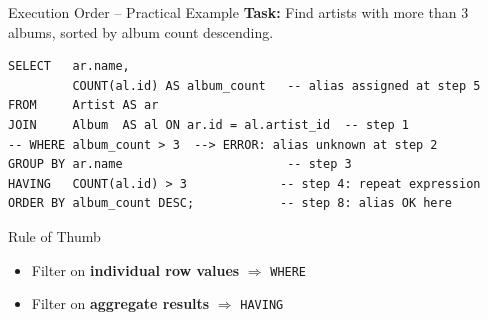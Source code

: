 \begin{frame}[fragile]{Execution Order -- Practical Example}
  \textbf{Task:} Find artists with more than 3 albums, sorted by album count descending.

  \begin{lstlisting}[style=sqlstyle]
SELECT   ar.name,
         COUNT(al.id) AS album_count   -- alias assigned at step 5
FROM     Artist AS ar
JOIN     Album  AS al ON ar.id = al.artist_id  -- step 1
-- WHERE album_count > 3  --> ERROR: alias unknown at step 2
GROUP BY ar.name                       -- step 3
HAVING   COUNT(al.id) > 3             -- step 4: repeat expression
ORDER BY album_count DESC;            -- step 8: alias OK here
  \end{lstlisting}

  \begin{block}{Rule of Thumb}
    \begin{itemize}
      \item Filter on \textbf{individual row values} $\Rightarrow$ \texttt{WHERE}
      \item Filter on \textbf{aggregate results} $\Rightarrow$ \texttt{HAVING}
    \end{itemize}
  \end{block}
\end{frame}

